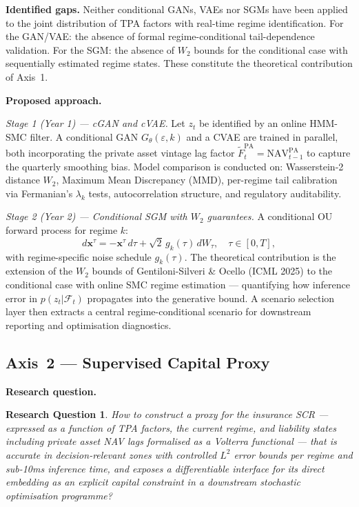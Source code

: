 \documentclass[11pt,a4paper]{article}
\newtheorem{rqthm}{Research Question}
\begin{document}
\noindent\textbf{Identified gaps.}
Neither conditional GANs, VAEs nor SGMs have been applied to the joint
distribution of TPA factors with real-time regime identification.
For the GAN/VAE: the absence of formal regime-conditional tail-dependence
validation. For the SGM: the absence of $W_2$ bounds for the conditional case
with sequentially estimated regime states. These constitute the theoretical
contribution of Axis~1.

\noindent\textbf{Proposed approach.}

\textit{Stage 1 (Year 1) --- cGAN and cVAE.}
Let $z_t$ be identified by an online HMM-SMC filter. A conditional GAN
$G_\theta(\varepsilon,k)$ and a CVAE are trained in parallel, both incorporating
the private asset vintage lag factor
$\tilde{F}^{\mathrm{PA}}_t = \mathrm{NAV}^{\mathrm{PA}}_{t-1}$
to capture the quarterly smoothing bias. Model comparison is conducted on:
Wasserstein-2 distance $W_2$, Maximum Mean Discrepancy (MMD), per-regime
tail calibration via Fermanian's $\lambda_k$ tests, autocorrelation structure,
and regulatory auditability.

\textit{Stage 2 (Year 2) --- Conditional SGM with $W_2$ guarantees.}
A conditional OU forward process for regime $k$:
\begin{equation}
  d\mathbf{x}^\tau = -\mathbf{x}^\tau\,d\tau
  + \sqrt{2}\,g_k(\tau)\,dW_\tau, \quad \tau \in [0,T],
\label{eq:sgm}
\end{equation}
with regime-specific noise schedule $g_k(\tau)$. The theoretical contribution
is the extension of the $W_2$ bounds of Gentiloni-Silveri \& Ocello (ICML 2025)
to the conditional case with online SMC regime estimation --- quantifying how
inference error in $p(z_t|\mathcal{F}_t)$ propagates into the generative bound.
A scenario selection layer then extracts a central regime-conditional scenario
for downstream reporting and optimisation diagnostics.

\subsection{Axis~2 --- Supervised Capital Proxy}

\noindent\textbf{Research question.}
\begin{rqthm}
How to construct a proxy for the insurance SCR --- expressed as a function of
TPA factors, the current regime, and liability states including private asset
NAV lags formalised as a Volterra functional --- that is accurate in
decision-relevant zones with controlled $L^2$ error bounds per regime and
sub-10ms inference time, and exposes a differentiable interface for its direct
embedding as an explicit capital constraint in a downstream stochastic
optimisation programme?
\end{rqthm}
\end{document}

